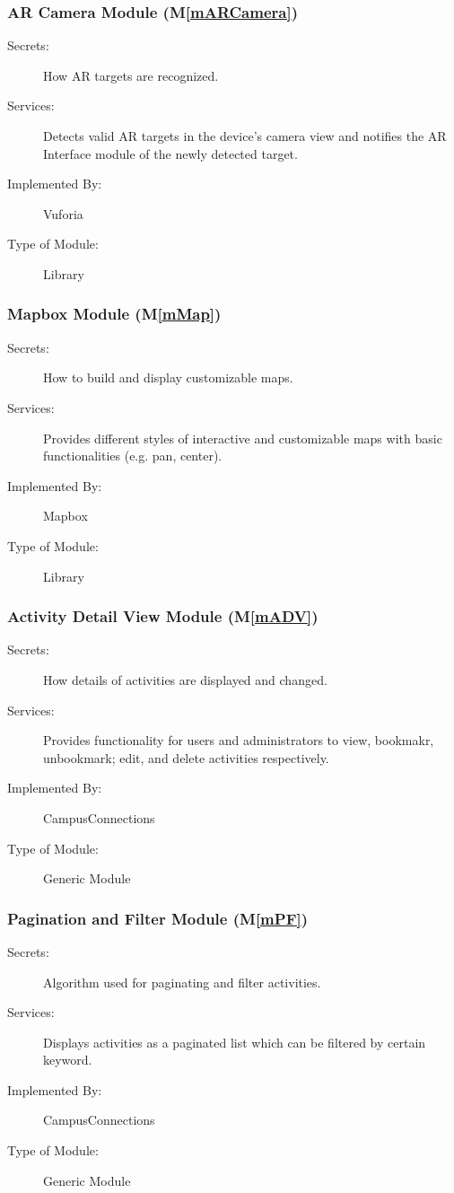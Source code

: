 \documentclass[12pt, titlepage]{article}
\newcommand{\mref}[1]{M\ref{#1}}
\begin{document}
\subsubsection{AR Camera Module (\mref{mARCamera})}
\begin{description}
\item[Secrets:]How AR targets are recognized.
\item[Services:]Detects valid AR targets in the device's camera view and notifies the AR Interface module of the newly detected target.
\item[Implemented By:] Vuforia
\item[Type of Module:] Library
\end{description}

\subsubsection{Mapbox Module (\mref{mMap})}
\begin{description}
\item[Secrets:]How to build and display customizable maps.
\item[Services:]Provides different styles of interactive and customizable maps with basic functionalities (e.g. pan, center).
\item[Implemented By:] Mapbox
\item[Type of Module:] Library
\end{description}

\subsubsection{Activity Detail View Module (\mref{mADV})}
\begin{description}
  \item[Secrets:]How details of activities are displayed and changed.
  \item[Services:]Provides functionality for users and administrators to view, bookmakr, unbookmark; edit, and delete activities respectively.
  \item[Implemented By:] CampusConnections
  \item[Type of Module:] Generic Module
\end{description}

\subsubsection{Pagination and Filter Module (\mref{mPF})}
\begin{description}
  \item[Secrets:]Algorithm used for paginating and filter activities.
  \item[Services:]Displays activities as a paginated list which can be filtered by certain keyword.
  \item[Implemented By:] CampusConnections
  \item[Type of Module:] Generic Module
\end{description}
\end{document}
